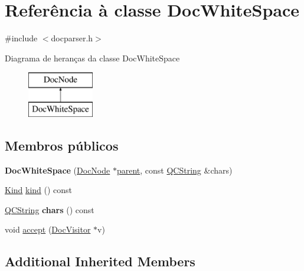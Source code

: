 \hypertarget{class_doc_white_space}{\section{Referência à classe Doc\-White\-Space}
\label{class_doc_white_space}
}


{\ttfamily \#include $<$docparser.\-h$>$}

Diagrama de heranças da classe Doc\-White\-Space\begin{figure}[H]
\begin{center}
\leavevmode
\includegraphics[height=2.000000cm]{class_doc_white_space}
\end{center}
\end{figure}
\subsection*{Membros públicos}
\begin{DoxyCompactItemize}
\item 
\hypertarget{class_doc_white_space_ab2e6fabbb92b4bf04a1d87e8968a8ab2}{{\bfseries Doc\-White\-Space} (\hyperlink{class_doc_node}{Doc\-Node} $\ast$\hyperlink{class_doc_node_abd7f070d6b0a38b4da71c2806578d19d}{parent}, const \hyperlink{class_q_c_string}{Q\-C\-String} \&chars)}\label{class_doc_white_space_ab2e6fabbb92b4bf04a1d87e8968a8ab2}

\item 
\hyperlink{class_doc_node_aa10c9e8951b8ccf714a59ec321bdac5b}{Kind} \hyperlink{class_doc_white_space_aa9d037bed9f9a083d0cd01485637d843}{kind} () const 
\item 
\hypertarget{class_doc_white_space_a8c20444a85add53ffd7d1f9f52b40842}{\hyperlink{class_q_c_string}{Q\-C\-String} {\bfseries chars} () const }\label{class_doc_white_space_a8c20444a85add53ffd7d1f9f52b40842}

\item 
void \hyperlink{class_doc_white_space_a7ba716e854ae2f8f87a4eb2140e302b6}{accept} (\hyperlink{class_doc_visitor}{Doc\-Visitor} $\ast$v)
\end{DoxyCompactItemize}
\subsection*{Additional Inherited Members}


